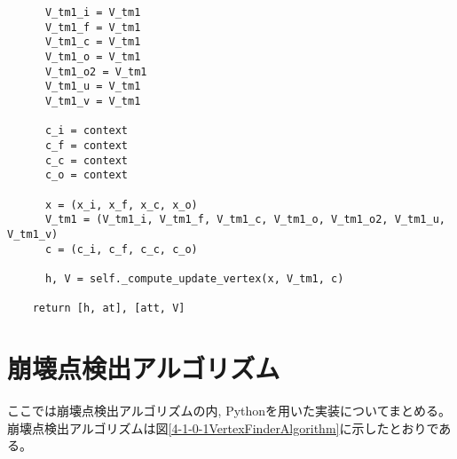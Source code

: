 \begin{lstlisting}
      V_tm1_i = V_tm1
      V_tm1_f = V_tm1
      V_tm1_c = V_tm1
      V_tm1_o = V_tm1
      V_tm1_o2 = V_tm1
      V_tm1_u = V_tm1
      V_tm1_v = V_tm1

      c_i = context
      c_f = context
      c_c = context
      c_o = context

      x = (x_i, x_f, x_c, x_o)
      V_tm1 = (V_tm1_i, V_tm1_f, V_tm1_c, V_tm1_o, V_tm1_o2, V_tm1_u, V_tm1_v)
      c = (c_i, c_f, c_c, c_o)

      h, V = self._compute_update_vertex(x, V_tm1, c)

    return [h, at], [att, V]
\end{lstlisting}

\section{崩壊点検出アルゴリズム} \label{sec:CodePairProduction}

ここでは崩壊点検出アルゴリズムの内, Pythonを用いた実装についてまとめる。
崩壊点検出アルゴリズムは図\ref{4-1-0-1VertexFinderAlgorithm}に示したとおりである。

